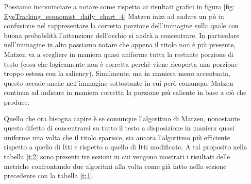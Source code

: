 \documentclass[%
	corpo=12pt,
    twoside,
    stile=classica,
    oldstyle,
    tipotesi=custom,
    greek,
    evenboxes,
]{toptesi}
\begin{document}
{Possiamo incominciare a notare come rispetto ai risultati grafici in figura \ref{fig: EyeTracking_economist_daily_chart_4} Matzen inizi ad andare un pò in confusione nel rappresentare la corretta porzione dell'immagine sulla quale con buona probabilità l'attenzione dell'occhio si andrà a concentrare. In particolare nell'immagine in alto possiamo notare che appena il titolo non è più presente, Matzen va a scegliere in maniera quasi uniforme tutta la restante porzione di testo (cosa che logicamente non è corretta perchè viene ricoperta una porzione troppo estesa con la saliency). Similmente, ma in maniera meno accentuata, questo accade anche nell'immagine sottostante in cui però comunque Matzen continua ad indicare in maniera corretta la porzione più saliente in base a ciò che produce.

Quello che ora bisogna capire è se comunque l'algoritmo di Matzen, nonostante questo difetto di concentrarsi su tutto il testo a disposizione in maniera quasi uniforme una volta che il titolo sparisce, sia ancora l'algoritmo più efficiente rispetto a quello di Itti e rispetto a quello di Itti modificato.
A tal proposito nella tabella \ref{t:2} sono presenti tre sezioni in cui vengono mostrati i risultati delle metriche confrontando due algoritmi alla volta come già fatto nella sezione precedente con la tabella \ref{t:1}.




}
\end{document}
